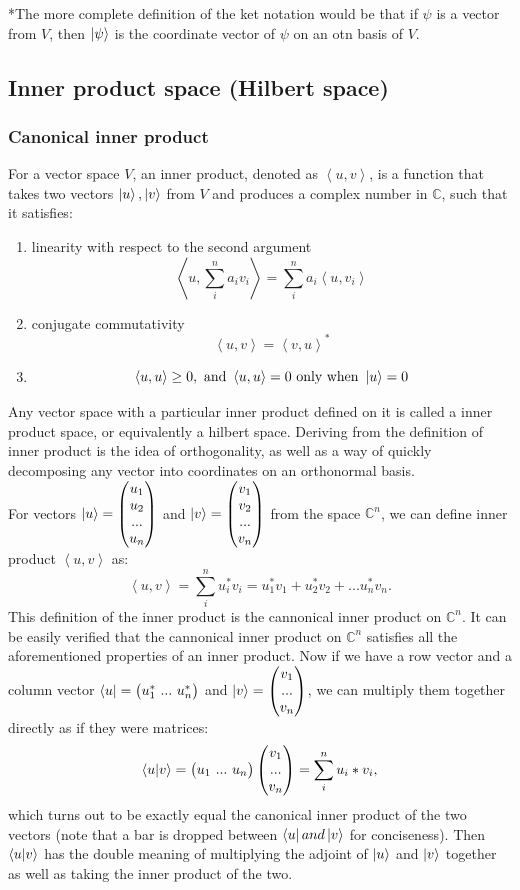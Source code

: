 \documentclass[12pt]{article}
\begin{document}
*The more complete definition of the ket notation would be that if $\psi$ is a vector from $V$, then $\ket{\psi}$ is the coordinate vector of $\psi$ on an otn basis of $V$.
\subsection{Inner product space (Hilbert space)}
\subsubsection{Canonical inner product}
For a vector space $V$, an inner product, denoted as $\left<u,v\right>$, is a function that takes two vectors $\ket{u},\ket{v}$ from $V$ and produces a complex number in $\mathbb{C}$, such that it satisfies:
\begin{enumerate}
    \item linearity with respect to the second argument $$\left<u,\sum_i^n a_iv_i\right>=\sum_i^n a_i\left<u,v_i\right>$$
    \item conjugate commutativity
    $$\left<u,v\right>=\left<v,u\right>^*$$
    \item $$\left<u,u\right>\geq 0, \text{ and }\left<u,u\right>=0 \text{ only when }\ket{u}=0$$
\end{enumerate}
Any vector space with a particular inner product defined on it is called a inner product space, or equivalently a hilbert space. Deriving from the definition of inner product is the idea of orthogonality, as well as a way of quickly decomposing any vector into coordinates on an orthonormal basis. \\
For vectors $\ket{u}=\pmqty{u_1\\u_2\\...\\u_n}$ and $\ket{v}=\pmqty{v_1\\v_2\\...\\v_n}$ from the space $\mathbb{C}^n$, we can define inner product $\left<u,v\right>$ as:
$$\left<u,v\right>=\sum_i^n u_i^*v_i=u_1^*v_1+u_2^*v_2+...u_n^*v_n.$$
This definition of the inner product is the cannonical inner product on $\mathbb{C}^n$. It can be easily verified that the cannonical inner product on $\mathbb{C}^n$ satisfies all the aforementioned properties of an inner product. Now if we have a row vector and a column vector $\bra{u}=\pmqty{u_1^*\ ...\ u_n^*}$ and $\ket{v}=\pmqty{v_1\\...\\v_n}$, we can multiply them together directly as if they were matrices:
$$\bra{u}\ket{v}=\pmqty{u_1\ ...\ u_n}\pmqty{v_1\\...\\v_n}=\sum_i^n u_i*v_i,$$
which turns out to be exactly equal the canonical inner product of the two vectors (note that a bar is dropped between $\bra{u} and \ket{v}$ for conciseness). Then $\bra{u}\ket{v}$ has the double meaning of multiplying the adjoint of $\ket{u}$ and $\ket{v}$ together as well as taking the inner product of the two.
\end{document}
